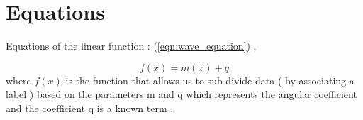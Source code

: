 \documentclass[a4paper,10pt,oneside]{article}
\begin{document}
\section{Equations}
\label{sec:equations}

Equations of the linear function : (\ref{eqn:wave_equation})
\cite{eWilliams1999},

\begin{equation}
  \label{eqn:wave_equation}
     f( x ) = m (x) + q 
\end{equation}
where $f(x)$ is the function that 
allows us to sub-divide data ( by associating a label ) based on the 
parameters m and q which represents the angular 
coefficient and the coefficient q is a known term .





\end{document}
